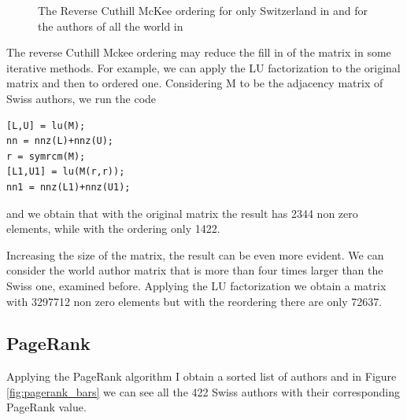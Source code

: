 \documentclass[]{usiinfbachelorproject}
\begin{document}
\begin{figure}[tb]
	\centering
	\caption{ The Reverse Cuthill McKee ordering for only Switzerland in  and for the authors of all the world in }
	\label{fig:CuthillMcKee}
\end{figure}

The reverse Cuthill Mckee ordering may reduce the fill in of the matrix in some iterative methods. For example, we can apply the LU factorization to the original matrix and then to ordered one. Considering M to be the  adjacency matrix of Swiss authors, we run the code

\lstset{language=Matlab}
\begin{lstlisting}
[L,U] = lu(M); 	  
nn = nnz(L)+nnz(U);
r = symrcm(M);
[L1,U1] = lu(M(r,r));
nn1 = nnz(L1)+nnz(U1);
\end{lstlisting}

and we obtain that with the original matrix the result has 2344 non zero elements, while with the ordering only 1422. 

Increasing the size of the matrix, the result can be even more evident. We can consider the world author matrix that is more than four times larger than the Swiss one, examined before. Applying the LU factorization we obtain a matrix with 3297712 non zero elements but with the reordering there are only 72637.

\subsection{PageRank}
Applying the PageRank algorithm I obtain a sorted list of authors and in Figure \ref{fig:pagerank_bars} we can see all the 422 Swiss authors with their corresponding PageRank value. 
\end{document}
